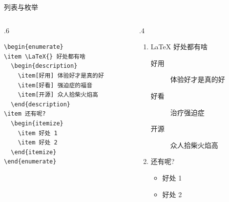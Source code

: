 \begin{frame}[fragile]{列表与枚举}
  \begin{columns}
    \begin{column}{.6\textwidth}
      \begin{lstlisting}[basicstyle=\ttfamily\small]
\begin{enumerate}
\item \LaTeX{} 好处都有啥
  \begin{description}
    \item[好用] 体验好才是真的好
    \item[好看] 强迫症的福音
    \item[开源] 众人拾柴火焰高
  \end{description}
\item 还有呢?
  \begin{itemize}
    \item 好处 1
    \item 好处 2
  \end{itemize}
\end{enumerate}
\end{lstlisting}
    \end{column}
    \begin{column}{.4\textwidth}
      {\small
        \begin{enumerate}
          \item \LaTeX{} 好处都有啥
                \begin{description}
                  \item[好用] 体验好才是真的好
                  \item[好看] 治疗强迫症
                  \item[开源] 众人拾柴火焰高
                \end{description}
          \item 还有呢?
                \begin{itemize}
                  \item 好处 1
                  \item 好处 2
                \end{itemize}
        \end{enumerate}
      }
    \end{column}
  \end{columns}

\end{frame}

